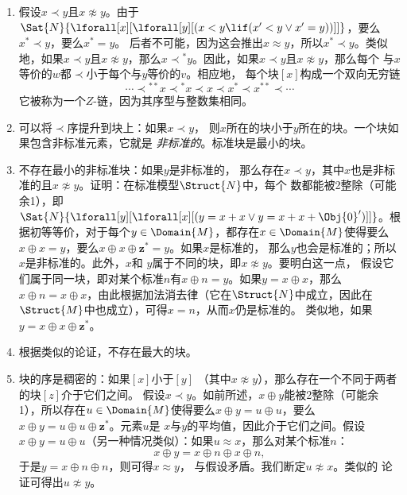 \documentclass[../../../include/open-logic-section]{subfiles}
\begin{document}
\begin{enumerate}
\item 假设$x \prec y$且$x \not\approx y$。由于
  $\Sat{N}{\lforall[x][\lforall[y][(x < y \lif (x' < y \lor x' =
      y))]]}$，要么$x^* \prec y$，要么$x^* = y$。
  后者不可能，因为这会推出$x \approx y$，所以$x^* \prec
  y$。类似地，如果$x \prec y$且$x \not\approx y$，那么$x \prec
  {^*y}$。因此，如果$x \prec y$且$x \not\approx y$，那么每个
  与$x$等价的$w$都$\prec$小于每个与$y$等价的$v$。相应地，
  每个块$[x]$构成一个双向无穷链
  \[
  \cdots \prec  {^{**}x} \prec {^*}x \prec x \prec x^* \prec x^{**}
  \prec \cdots
  \]
  它被称为一个$Z$-链，因为其序型与整数集相同。
\item 可以将$\prec$序提升到块上：如果$x \prec y$，
  则$x$所在的块小于$y$所在的块。一个块如果包含非标准元素，它就是
  \emph{非标准的}。标准块是最小的块。
\item 不存在最小的非标准块：如果$y$是非标准的，
  那么存在$x \prec y$，其中$x$也是非标准的且$x
  \not\approx y$。证明：在标准模型$\Struct{N}$中，每个
  数都能被2整除（可能余1），即
  $\Sat{N}{\lforall[y][\lforall[x][(y = x + x \lor y = x + x +
        \Obj{0}')]]}$。根据初等等价，对于每个$y \in
  \Domain{M}$，都存在$x \in \Domain{M}$使得要么$x \oplus x
  = y$，要么$x \oplus x \oplus \mathbf{z}^*= y$。如果$x$是标准的，
  那么$y$也会是标准的；所以$x$是非标准的。此外，$x$和
  $y$属于不同的块，即$x \not\approx y$。要明白这一点，
  假设它们属于同一块，即对某个标准$n$有$x \oplus n =
  y$。如果$y = x \oplus x$，那么$x \oplus n = x
  \oplus x$，由此根据加法消去律（它在$\Struct{N}$中成立，因此在
  $\Struct{M}$中也成立），可得$x = n$，从而$x$仍是标准的。
  类似地，如果$y = x \oplus x
  \oplus \mathbf{z}^*$。
\item 根据类似的论证，不存在最大的块。
\item 块的序是稠密的：如果$[x]$小于$[y]$
  （其中$x \not\approx y$），那么存在一个不同于两者的块$[z]$介于它们之间。
  假设$x \prec y$。如前所述，$x \oplus
  y$能被2整除（可能余1），所以存在$u
  \in \Domain{M}$使得要么$x \oplus y = u \oplus u$，要么$x
  \oplus y = u \oplus u \oplus \mathbf{z}^*$。元素$u$是
  $x$与$y$的平均值，因此介于它们之间。假设$x \oplus y =
  u \oplus u$（另一种情况类似）：如果$u \approx x$，那么对某个标准$n$：
  \[
  x \oplus y = x \oplus n \oplus x \oplus n,
  \]
  于是$y = x \oplus n \oplus n$，则可得$x \approx y$，
  与假设矛盾。我们断定$u \not\approx x$。类似的
  论证可得出$u \not\approx y$。
\end{enumerate}
\end{document}
